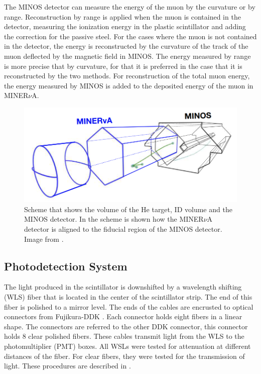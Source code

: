 The MINOS detector can measure the energy of the muon by the curvature or by range. Reconstruction by range is applied when the muon is contained in the detector, measuring the ionization energy in the plastic scintillator and adding the correction for the passive steel. For the cases where the muon is not contained in the detector, the energy is reconstructed by the curvature of the track of the muon deflected by the magnetic field in MINOS. The energy measured by range is more precise that by curvature, for that it is preferred in the case that it is reconstructed by the two methods. For reconstruction of the total muon energy, the energy measured by MINOS is added to the deposited energy of the muon in MINER$\nu$A. 


\begin{figure}[!htb]
    \centering
    \includegraphics[scale=0.4]{Figures/Chapter2/MnvMINOS.png}
    \caption{Scheme that shows the volume of the He target, ID volume and the MINOS detector. In the scheme is shown how the MINER$\nu$A detector is aligned to the fiducial region of the MINOS detector. Image from \cite{MarvinThesis}.}
    \label{fig:MnvExp:MnvDetector:WholeMINERvADet}
\end{figure}

\subsection{Photodetection System}
\label{Cap:MnvExp:MnvDetector:PhotoDetectionSystem}

The light produced in the scintillator is downshifted by a wavelength shifting (WLS) fiber that is located in the center of the scintillator strip. The end of this fiber is polished to a mirror level. The ends of the cables are encrusted to optical connectors from Fujikura-DDK \cite{OpticalConnector}. Each connector holds eight fibers in a linear shape. The connectors are referred to the other DDK connector, this connector holds 8 clear polished fibers. These cables transmit light from the WLS to the photomultiplier (PMT) boxes. All WSLs were tested for attenuation at different distances of the fiber. For clear fibers, they were tested for the transmission of light. These procedures are described in \cite{MINERvA}.

